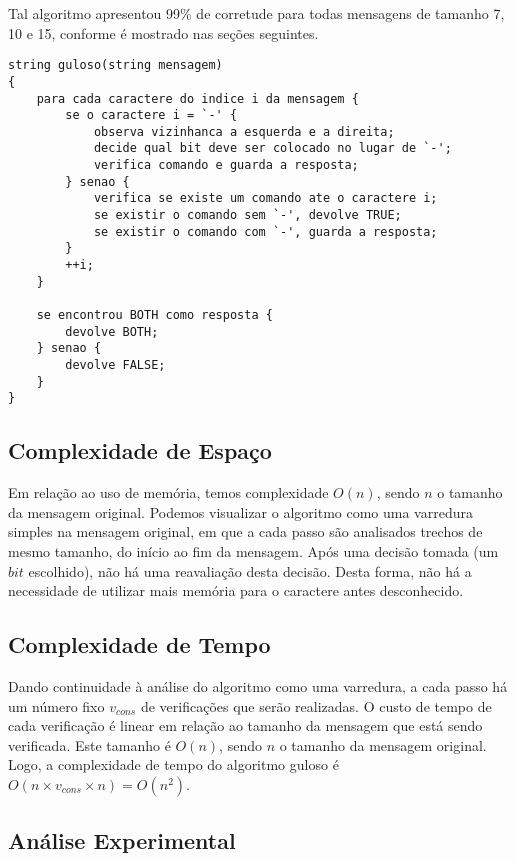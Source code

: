 \documentclass[a4paper,12pt,titlepage]{article}
\begin{document}
Tal algoritmo apresentou 99\% de corretude para todas mensagens de tamanho 7, 10 e 15, conforme é mostrado nas seções seguintes.

\newpage

\begin{lstlisting}[caption=Algoritmo Guloso]
string guloso(string mensagem)
{
    para cada caractere do indice i da mensagem {
        se o caractere i = `-' {
            observa vizinhanca a esquerda e a direita;
            decide qual bit deve ser colocado no lugar de `-';
            verifica comando e guarda a resposta;
        } senao {
            verifica se existe um comando ate o caractere i;
            se existir o comando sem `-', devolve TRUE;
            se existir o comando com `-', guarda a resposta;
        }
        ++i;
    }
    
    se encontrou BOTH como resposta {
        devolve BOTH;
    } senao {
        devolve FALSE;
    }
}
\end{lstlisting}

\subsection{Complexidade de Espaço}

Em relação ao uso de memória, temos complexidade $O(n)$, sendo $n$ o tamanho da mensagem original. Podemos visualizar o algoritmo como uma varredura simples na mensagem original, em que a cada passo são analisados trechos de mesmo tamanho, do início ao fim da mensagem. Após uma decisão tomada (um $bit$ escolhido), não há uma reavaliação desta decisão. Desta forma, não há a necessidade de utilizar mais memória para o caractere antes desconhecido.

\subsection{Complexidade de Tempo}

Dando continuidade à análise do algoritmo como uma varredura, a cada passo há um número fixo $v_{cons}$ de verificações que serão realizadas. O custo de tempo de cada verificação é linear em relação ao tamanho da mensagem que está sendo verificada. Este tamanho é $O(n)$, sendo $n$ o tamanho da mensagem original. Logo, a complexidade de tempo do algoritmo guloso é $O(n \times v_{cons} \times n) = O(n^2)$.

\subsection{Análise Experimental}
\end{document}
